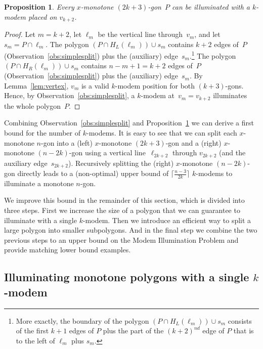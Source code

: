 \documentclass[A4]{article}
\newtheorem{proposition}[theorem]{Proposition}
\begin{document}
\begin{proposition}\label{prop:2k+3}
Every $x$-monotone $(2k+3)$-gon~$P$ can be illuminated with a \mbox{$k$-modem} placed on $v_{k+2}$.
\end{proposition}
\begin{proof}
  Let $m=k+2$, let $\ell_{m}$ be the vertical line through~$v_m$, and let~$s_m = P\cap\ell_{m}$.
The polygon $(P\cap H_L(\ell_m))\cup s_m$ contains $k+2$ edges of~$P$ (Observation~\ref{obs:simplesplit}) plus the (auxiliary) edge~$s_m$.\footnote{More exactly, the boundary of the polygon $(P\cap H_L(\ell_m))\cup s_m$ consists of the first $k+1$ edges of $P$ plus the part of the $(k+2)^{nd}$ edge of $P$ that is to the left of $\ell_m$ plus $s_m$.}
  The polygon $(P\cap H_R(\ell_m))\cup s_m$ contains $n-m+1=k+2$ edges of~$P$ (Observation~\ref{obs:simplesplit}) plus the (auxiliary) edge~$s_m$.
By Lemma~\ref{lem:vertex}, $v_m$ is a valid \mbox{$k$-modem} position for both $(k+3)$-gons.
Hence, by Observation~\ref{obs:simplesplit}, a \mbox{$k$-modem} at~$v_m=v_{k+2}$ illuminates the whole polygon~$P$. 
\end{proof}

Combining Observation~\ref{obs:simplesplit} and Proposition~\ref{prop:2k+3} we can derive a first bound for the number of \mbox{$k$-modems}.
It is easy to see that we can split each $x$-monotone $n$-gon into a (left) $x$-monotone $(2k+3)$-gon and a (right) $x$-monotone $(n-2k)$-gon using a vertical line~$\ell_{2k+2}$ through $v_{2k+2}$ (and the auxiliary edge~$s_{2k+2}$).
Recursively splitting the (right) $x$-monotone $(n-2k)$-gon directly leads to a (non-optimal) upper bound of $\big\lceil \frac{n-3}{2k} \big\rceil$ \mbox{$k$-modems} to illuminate a monotone $n$-gon.

We improve this bound in the remainder of this section, which is divided into three steps.
First we increase the size of a polygon that we can guarantee to illuminate with a single \mbox{$k$-modem}.
Then we introduce an efficient way to split a large polygon into smaller subpolygons.
And in the final step we combine the two previous steps to an upper bound on the Modem Illumination Problem and provide matching lower bound examples.



\subsection{Illuminating monotone polygons with a single $k$-modem}
\label{sec:gmono-single}
\end{document}
